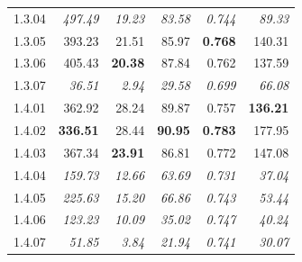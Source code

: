 \begin{table}[!t]
\begin{tabular}{@{}lrrrrr@{}}
    1.3.04 & \textit{497.49} & \textit{19.23} & \textit{83.58} & \textit{0.744} & \textit{89.33} \\
    1.3.05 & 393.23 & 21.51 & 85.97 & \textbf{0.768} & 140.31 \\
    1.3.06 & 405.43 & \textbf{20.38} & 87.84 & 0.762 & 137.59 \\
    1.3.07 & \textit{36.51} & \textit{2.94} & \textit{29.58} & \textit{0.699} & \textit{66.08} \\
    \noalign{\smallskip}
    1.4.01 & 362.92 & 28.24 & 89.87 & 0.757 & \textbf{136.21} \\
    1.4.02 & \textbf{336.51} & 28.44 & \textbf{90.95} & \textbf{0.783} & 177.95 \\
    1.4.03 & 367.34 & \textbf{23.91} & 86.81 & 0.772 & 147.08 \\
    1.4.04 & \textit{159.73} & \textit{12.66} & \textit{63.69} & \textit{0.731} & \textit{37.04} \\
    1.4.05 & \textit{225.63} & \textit{15.20} & \textit{66.86} & \textit{0.743} & \textit{53.44} \\
    1.4.06 & \textit{123.23} & \textit{10.09} & \textit{35.02} & \textit{0.747} & \textit{40.24} \\
    1.4.07 & \textit{51.85} & \textit{3.84} & \textit{21.94} & \textit{0.741} & \textit{30.07} \\
\hline
\end{tabular}
\end{table}